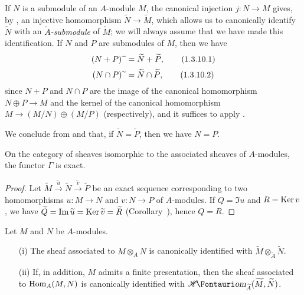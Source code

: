 \begin{env}[1.3.10]
\label{I.1.3.10}
If $N$ is a submodule of an $A$-module $M$, the canonical injection $j:N\to M$ gives, by , an injective homomorphism $\widetilde{N}\to\widetilde{M}$, which allows us to canonically identify $\widetilde{N}$ with an \emph{$\widetilde{A}$-submodule} of $\widetilde{M}$;
we will always assume that we have made this identification.
If $N$ and $P$ are submodules of $M$, then we have
\[
\label{I.1.3.10.1}
  (N+P){\,\widetilde{\,}\,}=\widetilde{N}+\widetilde{P},
  \tag{1.3.10.1}
\]
\[
\label{I.1.3.10.2}
  (N\cap P){\,\widetilde{\,}\,}=\widetilde{N}\cap\widetilde{P},
  \tag{1.3.10.2}
\]
since $N+P$ and $N\cap P$ are the image of the canonical homomorphism
$N\oplus P\to M$ and the kernel of the canonical homomorphism $M\to(M/N)\oplus(M/P)$ (respectively), and it suffices to apply .

We conclude from  and  that, if $\widetilde{N}=\widetilde{P}$, then we have $N=P$.
\end{env}

\begin{corollary}[1.3.11]
\label{I.1.3.11}
On the category of sheaves isomorphic to the associated sheaves of $A$-modules, the functor $\Gamma$ is exact.
\end{corollary}

\begin{proof}
Let $\widetilde{M}\xrightarrow{\widetilde{u}}\widetilde{N}\xrightarrow{\widetilde{v}}\widetilde{P}$ be an exact sequence corresponding to two homomorphisms $u:M\to N$ and $v:N\to P$ of $A$-modules.
If $Q=\Im u$ and $R=\operatorname{Ker} v$, we have $\widetilde{Q}=\operatorname{Im}\widetilde{u}=\operatorname{Ker}\widetilde{v}=\widetilde{R}$ (Corollary~), hence $Q=R$.
\end{proof}

\begin{corollary}[1.3.12]
\label{I.1.3.12}
Let $M$ and $N$ be $A$-modules.
\begin{enumerate}
  \item[{\rm(i)}] The sheaf associated to $M\otimes_A N$ is canonically identified with $\widetilde{M}\otimes_{\widetilde{A}}\widetilde{N}$.
  \item[{\rm(ii)}] If, in addition, $M$ admits a finite presentation, then the sheaf associated to $\operatorname{Hom}_A(M,N)$ is canonically identified with $\shHom_{\widetilde{A}}(\widetilde{M},\widetilde{N})$.
\end{enumerate}
\end{corollary}

